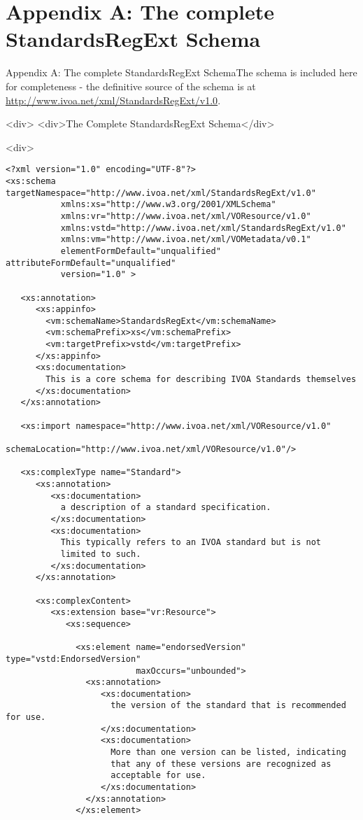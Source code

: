 \documentclass[11pt,a4paper]{ivoa}
\begin{document}
{{\section{Appendix A: The complete StandardsRegExt Schema}

\label{}

Appendix A: The complete StandardsRegExt SchemaThe schema is included here for completeness - the definitive source of the schema is at \href{http://www.ivoa.net/xml/StandardsRegExt/v1.0}{http://www.ivoa.net/xml/StandardsRegExt/v1.0}.


<div>
<div>The Complete StandardsRegExt Schema</div>

<div>
\begin{verbatim}<?xml version="1.0" encoding="UTF-8"?>
<xs:schema targetNamespace="http://www.ivoa.net/xml/StandardsRegExt/v1.0" 
           xmlns:xs="http://www.w3.org/2001/XMLSchema" 
           xmlns:vr="http://www.ivoa.net/xml/VOResource/v1.0" 
           xmlns:vstd="http://www.ivoa.net/xml/StandardsRegExt/v1.0" 
           xmlns:vm="http://www.ivoa.net/xml/VOMetadata/v0.1"
           elementFormDefault="unqualified" attributeFormDefault="unqualified"
           version="1.0" >

   <xs:annotation>
      <xs:appinfo>
        <vm:schemaName>StandardsRegExt</vm:schemaName>
        <vm:schemaPrefix>xs</vm:schemaPrefix>
        <vm:targetPrefix>vstd</vm:targetPrefix>
      </xs:appinfo>
      <xs:documentation>
        This is a core schema for describing IVOA Standards themselves
      </xs:documentation>
   </xs:annotation>

   <xs:import namespace="http://www.ivoa.net/xml/VOResource/v1.0" 
              schemaLocation="http://www.ivoa.net/xml/VOResource/v1.0"/>

   <xs:complexType name="Standard">
      <xs:annotation>
         <xs:documentation>
           a description of a standard specification.
         </xs:documentation>
         <xs:documentation>
           This typically refers to an IVOA standard but is not
           limited to such.  
         </xs:documentation>
      </xs:annotation>

      <xs:complexContent>
         <xs:extension base="vr:Resource">
            <xs:sequence>
 
              <xs:element name="endorsedVersion" type="vstd:EndorsedVersion" 
                          maxOccurs="unbounded">
                <xs:annotation>
                   <xs:documentation>
                     the version of the standard that is recommended for use.
                   </xs:documentation>
                   <xs:documentation>
                     More than one version can be listed, indicating
                     that any of these versions are recognized as
                     acceptable for use.  
                   </xs:documentation>
                </xs:annotation>
              </xs:element>


\end{verbatim}}}
\end{document}
